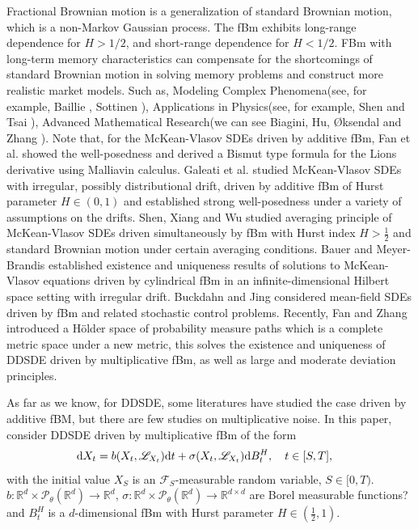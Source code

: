 \documentclass[12pt]{article}
\def\L{\mathscr{L}}
\def\R{\mathbb R}
\def\F{\mathscr F}
\def\d{\text{\rm{d}}}
\def\pb{\mathscr{P}}
\numberwithin{equation}{section}
\begin{document}
	Fractional Brownian motion is a generalization of standard Brownian motion, which is a non-Markov Gaussian process. The fBm exhibits long-range dependence for $H> 1/2$,
	and short-range dependence for $H < 1/2$. FBm with long-term memory characteristics can compensate for the shortcomings of standard Brownian motion in solving memory problems and construct more realistic market models. Such as, Modeling Complex Phenomena(see, for example, Baillie \cite{RTB}, Sottinen \cite{TPS}), Applications in Physics(see, for example, Shen and Tsai \cite{SWS}), Advanced Mathematical Research(we can see  Biagini,  Hu, {\O}ksendal and  Zhang \cite{Biagini}).
	Note that, for the   McKean-Vlasov SDEs driven by additive fBm, Fan et al. \cite{FH}   showed the well-posedness and derived a Bismut type formula for the Lions derivative using Malliavin calculus. Galeati et al. \cite{Galeati} studied McKean-Vlasov SDEs with irregular, possibly distributional drift, driven by additive fBm of Hurst parameter $H\in (0,1)$ and established strong well-posedness under a variety of assumptions on the drifts. Shen, Xiang and Wu \cite{xj} studied averaging principle of McKean-Vlasov SDEs driven simultaneously by fBm with Hurst index $H>\frac12$ and standard Brownian motion under certain averaging conditions.
	Bauer and Meyer-Brandis \cite{Bauer} established existence and uniqueness results of solutions to McKean-Vlasov equations driven by cylindrical fBm in an infinite-dimensional Hilbert space setting with irregular drift. Buckdahn and Jing \cite{Buckdahn1} considered mean-field SDEs driven by fBm and related stochastic control problems.
	Recently, Fan and Zhang \cite{fan} introduced a H\"older space of probability measure paths
	which is a complete metric space under a new metric, this solves the existence and uniqueness of DDSDE driven by multiplicative fBm, as well as large and moderate deviation principles.
	
	As far as we know, for DDSDE, some literatures have studied the case driven by additive fBM, but there are few studies on multiplicative noise. In this paper, consider DDSDE driven by   multiplicative fBm of the form
	\begin{equation}\label{eq-1}
		\begin{aligned}
			\d X_t&=b(X_t,\L_{X_t})\d t+\sigma(X_t,\L_{X_t})\d B^H_t,\quad t\in [S,T],
		\end{aligned}
	\end{equation}
	with the initial value $X_S$ is an $\F_S$-measurable random variable, $S\in[0,T)$. $b:\R^d  \times \pb_\theta(\R^d) \to \R^d$, $\sigma:\R^d \times \pb_\theta(\R^d) \to \R^{d\times d}$ are Borel measurable functions? and $B^H_t$ is a $d$-dimensional fBm with Hurst parameter $H \in (\frac{1}{2}, 1)$.
	
\end{document}

